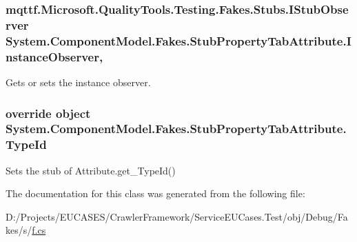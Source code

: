 \hypertarget{class_system_1_1_component_model_1_1_fakes_1_1_stub_property_tab_attribute_a9d3fe2b7a3510631a9d9799cdaf48345}{
\subsubsection[{Instance\-Observer}]{\setlength{\rightskip}{0pt plus 5cm}mqttf.\-Microsoft.\-Quality\-Tools.\-Testing.\-Fakes.\-Stubs.\-I\-Stub\-Observer System.\-Component\-Model.\-Fakes.\-Stub\-Property\-Tab\-Attribute.\-Instance\-Observer\hspace{0.3cm}{\ttfamily [get]}, {\ttfamily [set]}}}\label{class_system_1_1_component_model_1_1_fakes_1_1_stub_property_tab_attribute_a9d3fe2b7a3510631a9d9799cdaf48345}


Gets or sets the instance observer.

\hypertarget{class_system_1_1_component_model_1_1_fakes_1_1_stub_property_tab_attribute_a366184a48049e478452ac928f3a5a37f}{
\subsubsection[{Type\-Id}]{\setlength{\rightskip}{0pt plus 5cm}override object System.\-Component\-Model.\-Fakes.\-Stub\-Property\-Tab\-Attribute.\-Type\-Id\hspace{0.3cm}{\ttfamily [get]}}}\label{class_system_1_1_component_model_1_1_fakes_1_1_stub_property_tab_attribute_a366184a48049e478452ac928f3a5a37f}


Sets the stub of Attribute.\-get\-\_\-\-Type\-Id()



The documentation for this class was generated from the following file\-:\begin{DoxyCompactItemize}
\item 
D\-:/\-Projects/\-E\-U\-C\-A\-S\-E\-S/\-Crawler\-Framework/\-Service\-E\-U\-Cases.\-Test/obj/\-Debug/\-Fakes/s/\hyperlink{s_2f_8cs}{f.\-cs}\end{DoxyCompactItemize}
